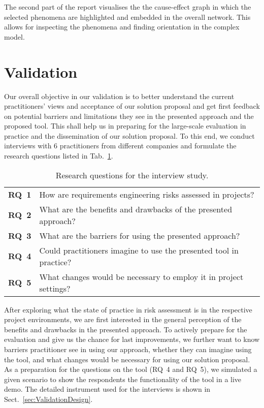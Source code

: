 \documentclass[lnbip]{svmultln}
\begin{document}
The second part of the report visualises the the cause-effect graph in which the selected phenomena are highlighted and embedded in the overall network. This allows for inspecting the phenomena and finding orientation in the complex model.

\section{Validation}
\label{sec:validation}

Our overall objective in our validation is to better understand the current practitioners' views and acceptance of our solution proposal and get first feedback on potential barriers and limitations they see in the presented approach and the proposed tool. This shall help us in preparing for the large-scale evaluation in practice and the dissemination of our solution proposal. To this end, we conduct interviews with 6 practitioners from different companies and formulate the research questions listed in Tab.~\ref{tab:RQs}. 

\begin{table}[htbp]
\centering
\begin{tabular}{lp{10cm}}
\toprule
\bf{RQ~1}&How are requirements engineering risks assessed in projects?\\
\bf{RQ~2}&What are the benefits and drawbacks of the presented approach?\\
\bf{RQ~3}&What are the barriers for using the presented approach?\\
\bf{RQ~4}&Could practitioners imagine to use the presented tool in practice?\\
\bf{RQ~5}&What changes would be necessary to employ it in project settings?\\
\bottomrule
\end{tabular}
\caption{Research questions for the interview study.}
\label{tab:RQs}
\end{table}
After exploring what the state of practice in risk assessment is in the respective project environments, we are first interested in the general perception of the benefits and drawbacks in the presented approach. To actively prepare for the evaluation and give us the chance for last improvements, we further want to know barriers practitioner see in using our approach, whether they can imagine using the tool, and what changes would be necessary for using our solution proposal. As a preparation for the questions on the tool (RQ~4 and RQ~5), we simulated a given scenario to show the respondents the functionality of the tool in a live demo. The detailed instrument used for the interviews is shown in Sect.~\ref{sec:ValidationDesign}.
\end{document}
